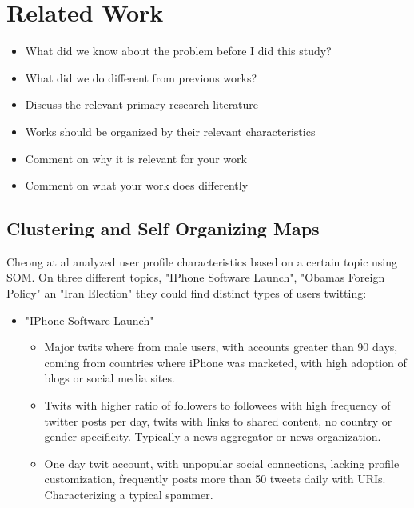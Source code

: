 \section{Related Work}

\begin{itemize}
  \item What did we know about the problem before I did this study? 
  \item What did we do different from previous works? 
  \item Discuss the relevant primary research literature 
  \item Works should be organized by their relevant characteristics 
  \item Comment on why it is relevant for your work 
  \item Comment on what your work does differently 
\end{itemize}

\subsection{Clustering and Self Organizing Maps} %
\label{sub:self_organizing_maps}

Cheong at al\cite{Cheong2010} analyzed user profile characteristics based on a certain topic using SOM. On three different topics, "IPhone Software Launch", "Obamas Foreign Policy" an "Iran Election" they could find distinct types of users twitting:

\begin{itemize}
  \item "IPhone Software Launch"
  \begin{itemize}
    \item Major twits where from male users, with accounts greater than 90 days, coming from countries where iPhone was marketed, with high adoption of blogs or social media sites.
    \item Twits with higher ratio of followers to followees with high frequency of twitter posts per day, twits with links to shared content, no country or gender specificity. Typically a news aggregator or news organization.
    \item One day twit account, with unpopular social connections, lacking profile customization, frequently posts more than 50 tweets daily with URIs. Characterizing a typical spammer.
  \end{itemize}
\end{itemize}

